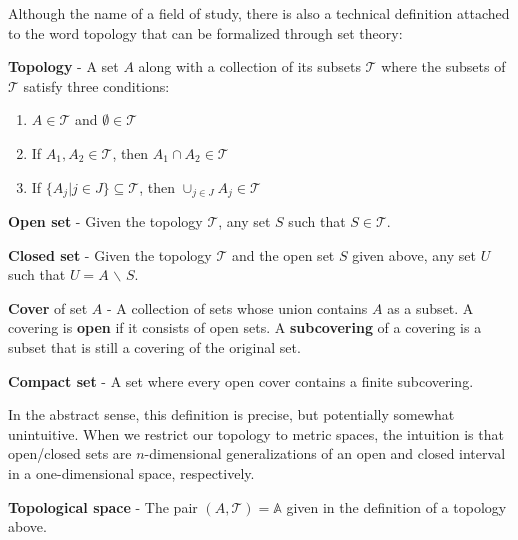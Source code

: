 Although the name of a field of study, there is also a technical definition attached to the word topology that can be formalized through set theory:

\begin{defn}
  \textbf{Topology} - A set $A$ along with a collection of its subsets
  $\mathcal{T}$ where the subsets of $\mathcal{T}$ satisfy three conditions:

  \begin{enumerate}
  \item $A \in \mathcal{T}$ and $\emptyset \in \mathcal{T}$
  \item If $A_1,A_2 \in \mathcal{T}$, then $A_1 \cap A_2 \in \mathcal{T}$
  \item If $\{A_j|j\in J\} \subseteq \mathcal{T}$, then $\cup_{j\in J} A_j \in \mathcal{T}$
  \end{enumerate}
\end{defn}

\begin{defn}
  \textbf{Open set} - Given the topology $\mathcal{T}$, any set $S$ such
  that $S \in \mathcal{T}$.
\end{defn}

\begin{defn}
  \textbf{Closed set} - Given the topology $\mathcal{T}$ and the open set $S$
  given above, any set $U$ such that $U = A$ $\backslash$ $S$.
\end{defn}

\begin{defn}
    \textbf{Cover} of set $A$ - A collection of sets whose union contains $A$ as a subset. A covering is \textbf{open} if it consists of open sets. A \textbf{subcovering} of a covering is a subset that is still a covering of the original set.
\end{defn}

\begin{defn}
    \textbf{Compact set} - A set where every open cover contains a finite subcovering.
\end{defn}


In the abstract sense, this definition is precise, but potentially somewhat unintuitive.
%
When we restrict our topology to metric spaces, the intuition is that open/closed sets are $n$-dimensional generalizations of an open and closed interval in a one-dimensional space, respectively.

\begin{defn}
  \textbf{Topological space} - The pair $(A,\mathcal{T}) = \mathbb{A}$ given in
  the definition of a topology above.
\end{defn}

